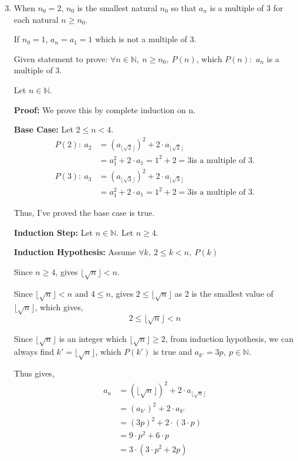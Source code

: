 \documentclass[12pt]{article}
\begin{document}
\begin{enumerate}[label=(\alph*)]
\setcounter{enumi}{2}
    \item When $n_0 = 2$, $n_0$ is the smallest natural $n_0$ so that $a_n$ is a multiple of 3 for each natural $ n \geq n_0$.
    
    If $n_0 = 1$, $a_n=a_1=1$ which is not a multiple of 3.

    Given statement to prove: $\forall n \in \mathbb{N},\ n \geq n_0,\ P(n)$, which $P(n):$ $a_n$ is a multiple of 3.

    Let $n \in \mathbb{N}$.

    \textbf{Proof:} We prove this by complete induction on n.

    \textbf{Base Case:} Let $2 \leq n < 4$.
    \begin{align*}
        P(2):\ a_2 &= (a_{\lfloor \sqrt{2} \rfloor})^2 + 2 \cdot a_{\lfloor \sqrt{2} \rfloor} \\
        &= a_1^2 + 2 \cdot a_1 = 1^2 + 2 = 3 \text{is a multiple of 3}.
    \end{align*}
    \begin{align*}
        P(3):\ a_3 &= (a_{\lfloor \sqrt{3} \rfloor})^2 + 2 \cdot a_{\lfloor \sqrt{3} \rfloor} \\
        &= a_1^2 + 2 \cdot a_1 = 1^2 + 2 = 3 \text{is a multiple of 3}.
    \end{align*}

    Thus, I've proved the base case is true.

    \textbf{Induction Step:} Let $n \in \mathbb{N}$. Let $n \geq 4$.

    \textbf{Induction Hypothesis:} Assume $\forall k,\ 2\leq k < n,\ P(k)$

    Since $n \geq 4$, gives $\lfloor \sqrt{n} \rfloor < n$.

    Since $\lfloor \sqrt{n} \rfloor < n$ and $4 \leq n$, gives $2 \leq \lfloor \sqrt{n} \rfloor$ as 2 is the smallest value of $\lfloor \sqrt{n} \rfloor$, which gives, $$2 \leq \lfloor \sqrt{n} \rfloor < n $$

    Since $\lfloor \sqrt{n} \rfloor$ is an integer which $\lfloor \sqrt{n} \rfloor \geq 2$, from induction hypothesis, we can always find $k' = \lfloor \sqrt{n} \rfloor$, which $P(k')$ is true and $a_{k'} = 3p,\ p \in \mathbb{N}$.

    Thus gives,
    \begin{align*}
        a_n &= (\lfloor \sqrt{n} \rfloor)^2 + 2\cdot a_{\lfloor \sqrt{n} \rfloor} \\
        &= (a_{k'})^2 + 2\cdot a_{k'} \\
        &= (3p)^2 + 2 \cdot (3 \cdot p) \\
        &= 9 \cdot p^2 + 6 \cdot p \\
        &= 3 \cdot (3\cdot p^2 + 2p)
    \end{align*}


\end{enumerate}
\end{document}
